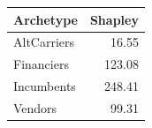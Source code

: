 \begin{tabular}{lr}
\toprule
Archetype & Shapley \\
\midrule
AltCarriers & 16.55 \\
Financiers & 123.08 \\
Incumbents & 248.41 \\
Vendors & 99.31 \\
\bottomrule
\end{tabular}
